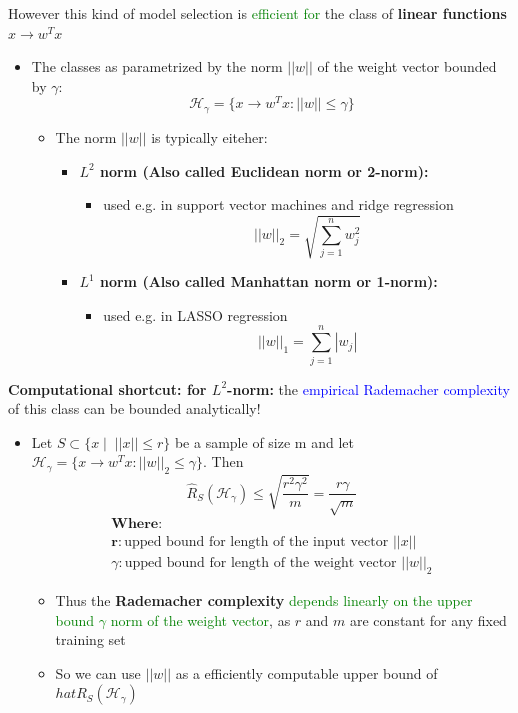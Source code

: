 \documentclass[12pt, a4paper]{article}
\begin{document}
However this kind of model selection is \textcolor{Green}{efficient for} the class of \textbf{linear functions $x \rightarrow w^T x$}

\begin{itemize}
  \item The classes as parametrized by the norm $||w||$ of the weight vector bounded by $\gamma$:
  $$
  \mathcal{H}_\gamma = \{x \rightarrow w^T x : ||w|| \leq \gamma\}
  $$
  \begin{itemize}
    \item The norm $||w||$ is typically eiteher:
    \begin{itemize}
      \item \textbf{$L^2$ norm (Also called Euclidean norm or 2-norm):}
      \begin{itemize}
        \item used e.g. in support vector machines and ridge regression
      $$
      ||w||_2 = \sqrt{\sum_{j=1}^n w_j^2}
      $$
      \end{itemize}
      \item \textbf{$L^1$ norm (Also called Manhattan norm or 1-norm):}
      \begin{itemize}
        \item used e.g. in LASSO regression
      $$
      ||w||_1 = \sum_{j=1}^n |w_j|
      $$
      \end{itemize}
    \end{itemize}
  \end{itemize}
\end{itemize}


\textbf{Computational shortcut: for $L^2$-norm:} the \textcolor{blue}{empirical Rademacher complexity} of this class can be bounded analytically!
\begin{itemize}
  \item Let $S \subset \{x \; | \;\; ||x|| \leq r \}$ be a sample of size m and let $\mathcal{H}_\gamma = \{x \rightarrow w^T x : ||w||_2 \leq \gamma\}$. Then
  $$
  \hat{R}_S(\mathcal{H}_\gamma) \leq \sqrt{\frac{r^2 \gamma^2}{m}} = \frac{r \gamma}{\sqrt{m}}
  $$
  \begin{gather*}
    \textbf{Where:} \\
    \textbf{r}: \text{upped bound for length of the input vector $||x||$} \\
    \textbf{$\gamma$}: \text{upped bound for length of the weight vector $||w||_2$}
  \end{gather*}
  \begin{itemize}
    \item Thus the \textbf{Rademacher complexity} \textcolor{Green}{depends linearly on the upper bound $\gamma$ norm of the weight vector}, as $r$ and $m$ are constant for any fixed training set
    \item So we can use $||w||$ as a efficiently computable upper bound of $hat{R}_S(\mathcal{H}_\gamma)$
  \end{itemize}
\end{itemize}
\end{document}
